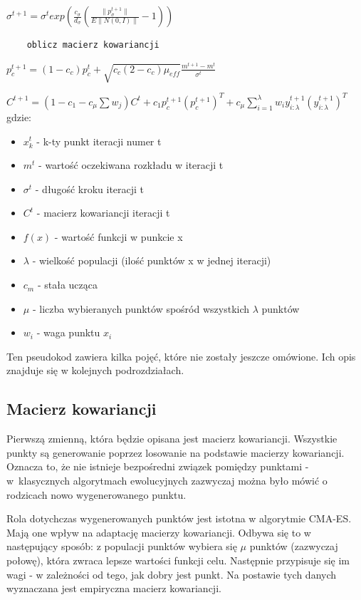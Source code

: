 \documentclass{mini}
\newcommand{\CMAES}{\mbox{CMA-ES}}
\begin{document}
\hspace{8,5ex} $\sigma^{t+1}=\sigma^t exp (\frac{c_\sigma}{d_\sigma}(\frac{\|p_\sigma^{t+1}\|}{E\|N(0,I)\|}-1))$
\begin{Verbatim}
	oblicz macierz kowariancji
\end{Verbatim}
\hspace{12ex} $p_c^{t+1} = (1-c_c)p_c^t+\sqrt{c_c(2-c_c)\mu_{eff}}\frac{m^{t+1}-m^t}{\sigma^t}$

\hspace{8,5ex} $C^{t+1} = (1-c_1-c_\mu\sum{w_j})C^t+c_1p_c^{t+1}{(p_c^{t+1})}^T+c_\mu \sum\limits_{i=1}^\lambda w_iy_{i:\lambda}^{t+1}{(y_{i:\lambda}^{t+1})}^T$
\newline
gdzie:
\begin{itemize}[noitemsep]
\item $x_k^t$ - k-ty punkt iteracji numer t
\item $m^t$ - wartość oczekiwana rozkładu w iteracji t
\item $\sigma^t$ - długość kroku iteracji t
\item $C^t$ - macierz kowariancji iteracji t
\item $f(x)$ - wartość funkcji w punkcie x
\item $\lambda$ - wielkość populacji (ilość punktów x w jednej iteracji)
\item $c_m$ - stała ucząca
\item $\mu$ - liczba wybieranych punktów spośród wszystkich $\lambda$ punktów
\item $w_i$ - waga punktu $x_i$
\end{itemize}

Ten pseudokod zawiera kilka pojęć, które nie zostały jeszcze omówione. Ich opis znajduje się w kolejnych podrozdziałach.

\subsection{Macierz kowariancji}
Pierwszą zmienną, która będzie opisana jest macierz kowariancji. Wszystkie punkty są generowanie poprzez losowanie na podstawie macierzy kowariancji. Oznacza to, że nie istnieje bezpośredni związek pomiędzy punktami - w~klasycznych algorytmach ewolucyjnych zazwyczaj można było mówić o rodzicach nowo wygenerowanego punktu.

Rola dotychczas wygenerowanych punktów jest istotna w algorytmie \CMAES. Mają one wpływ na adaptację macierzy kowariancji. Odbywa się to w następujący sposób: z populacji punktów wybiera się $\mu$ punktów (zazwyczaj połowę), która zwraca lepsze wartości funkcji celu. Następnie przypisuje się im wagi - w zależności od tego, jak dobry jest punkt. Na postawie tych danych wyznaczana jest empiryczna macierz kowariancji.
\end{document}
